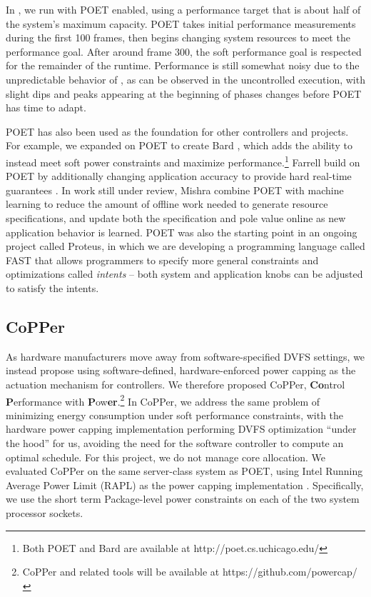 In , we run with POET enabled, using a performance target that is about half of the system's maximum capacity.
POET takes initial performance measurements during the first 100 frames, then begins changing system resources to meet the performance goal.
After around frame 300, the soft performance goal is respected for the remainder of the runtime.
Performance is still somewhat noisy due to the unpredictable behavior of , as can be observed in the uncontrolled execution, with slight dips and peaks appearing at the beginning of phases changes before POET has time to adapt.

POET has also been used as the foundation for other controllers and projects.
For example, we expanded on POET to create Bard \cite{Bard}, which adds the ability to instead meet soft power constraints and maximize performance.\footnote{Both POET and Bard are available at http://poet.cs.uchicago.edu/}
Farrell \etal build on POET by additionally changing application accuracy to provide hard real-time guarantees \cite{meantime}.
In work still under review, Mishra \etal combine POET with machine learning to reduce the amount of offline work needed to generate resource specifications, and update both the specification and pole value online as new application behavior is learned.
POET was also the starting point in an ongoing project called Proteus, in which we are developing a programming language called FAST that allows programmers to specify more general constraints and optimizations called \emph{intents} -- both system and application knobs can be adjusted to satisfy the intents.


\subsection{CoPPer}

As hardware manufacturers move away from software-specified DVFS settings, we instead propose using software-defined, hardware-enforced power capping as the actuation mechanism for controllers.
We therefore proposed CoPPer, \textbf{Co}ntrol \textbf{P}erformance with \textbf{P}ow\textbf{er}.\footnote{CoPPer and related tools will be available at https://github.com/powercap/}
In CoPPer, we address the same problem of minimizing energy consumption under soft performance constraints, with the hardware power capping implementation performing DVFS optimization ``under the hood'' for us, avoiding the need for the software controller to compute an optimal schedule.
For this project, we do not manage core allocation.
We evaluated CoPPer on the same server-class system as POET, using Intel Running Average Power Limit (RAPL) as the power capping implementation \cite{RAPL}.
Specifically, we use the short term Package-level power constraints on each of the two system processor sockets.

